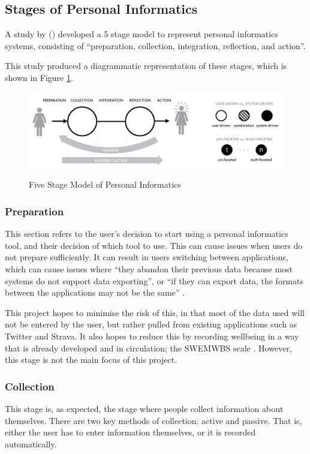 \documentclass[11pt,openright,a4paper]{report}
\begin{document}
\subsection{Stages of Personal Informatics}
A study by \citeauthor{li2010stage} (\citeyear{li2010stage}) developed a 5 stage model to represent personal informatics systems, consisting of \enquote{preparation, collection, integration, reflection, and action}.
\newpage

This study produced a diagrammatic representation of these stages, which is shown in Figure \ref{fig:5stagespi}.
\begin{figure}[ht]
\centering
\caption{Five Stage Model of Personal Informatics}
\includegraphics[width=\textwidth]{i/5stagespi.png}
\label{fig:5stagespi}
\end{figure}

\subsubsection{Preparation}
This section refers to the user's decision to start using a personal informatics tool, and their decision of which tool to use. This can cause issues when users do not prepare sufficiently. It can result in users switching between applications, which can cause issues where \enquote{they abandon their previous data
because most systems do not support data exporting}, or \enquote{if they can export data, the formats between the applications
may not be the same} \parencite{li2010stage}.

This project hopes to minimise the risk of this, in that most of the data used will not be entered by the user, but rather pulled from existing applications such as Twitter and Strava. It also hopes to reduce this by recording wellbeing in a way that is already developed and in circulation; the SWEMWBS scale \parencite{swemwbs}. However, this stage is not the main focus of this project.

\subsubsection{Collection}
This stage is, as expected, the stage where people collect information about themselves. There are two key methods of collection: active and passive. That is, either the user has to enter information themselves, or it is recorded automatically.
\end{document}
